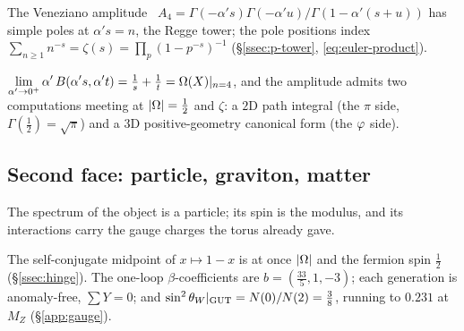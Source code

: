 \begin{proposition}\label{veneziano_regge_euler}
The Veneziano amplitude~\cite{Veneziano,ArkaniHamedTrnka,GGSA} $A_4=\Gamma(-\alpha's)\Gamma(-\alpha'u)/\Gamma(1-\alpha'(s+u))$ has simple poles at
$\alpha's=n$, the Regge tower; the pole positions index $\sum_{n\ge1}n^{-s}=\zeta(s)=\prod_p(1-p^{-s})^{-1}$
(\S\ref*{ssec:p-tower}, \eqref{eq:euler-product}).


\end{proposition}

\begin{proposition}\label{prop:ftlimit}
$\displaystyle\lim_{\alpha'\to0^{+}}\alpha'\,B(\alpha's,\alpha't)=\tfrac1s+\tfrac1t=\Omega(X)|_{n=4}$,
and the amplitude admits two computations meeting at $\lvert\Omega\rvert=\tfrac12$ and $\zeta$: a
$2$D path integral (the $\pi$ side, $\Gamma(\tfrac12)=\sqrt\pi$) and a $3$D positive-geometry
canonical form (the $\varphi$ side).

\end{proposition}

\subsection{Second face: particle, graviton, matter}\label{ssec:particle}
The spectrum of the object is a particle; its spin is the modulus, and its interactions carry the
gauge charges the torus already gave.

\begin{proposition}\label{prop:sm}
The self-conjugate midpoint of $x\mapsto1-x$ is at once $\lvert\Omega\rvert$ and the fermion spin
$\tfrac12$ (\S\ref*{ssec:hinge}). The one-loop $\beta$-coefficients are $b=(\tfrac{33}5,1,-3)$;
each generation is anomaly-free, $\sum Y=0$; and $\sin^2\theta_W|_{\rm GUT}=N(0)/N(2)=\tfrac38$, running to $0.231$ at $M_Z$ (\S\ref*{app:gauge}).

\end{proposition}

